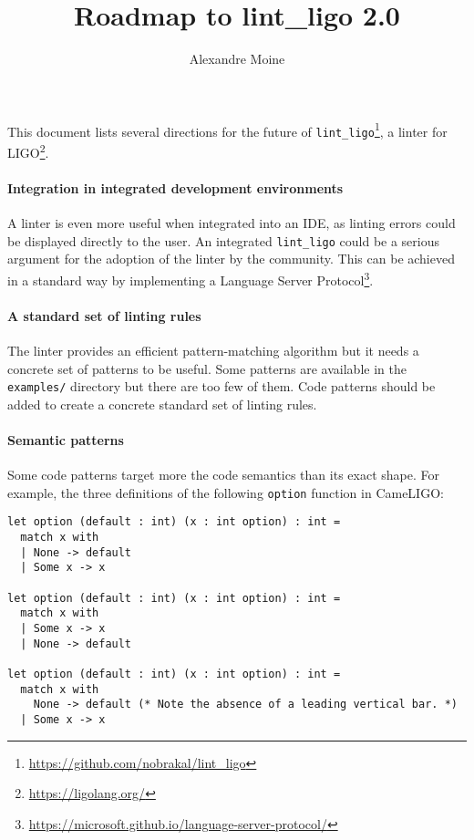 \documentclass[10pt,a4paper]{article}
\author{Alexandre Moine}
\title{Roadmap to lint\_ligo 2.0}
\begin{document}
\maketitle

This document lists several directions for the future of
\verb|lint_ligo|\footnote{\url{https://github.com/nobrakal/lint_ligo}},
a linter for LIGO\footnote{\url{https://ligolang.org/}}.

\paragraph{Integration in integrated development environments}

A linter is even more useful when integrated into an IDE, as linting
errors could be displayed directly to the user.
%
An integrated \verb|lint_ligo| could be a serious argument for the
adoption of the linter by the community.
This can be achieved in a standard way by implementing a Language
Server Protocol\footnote{\url{https://microsoft.github.io/language-server-protocol/}}.

\paragraph{A standard set of linting rules}

The linter provides an efficient pattern-matching algorithm but it
needs a concrete set of patterns to be useful. Some patterns are
available in the \verb|examples/| directory but there are too few of
them. Code patterns should be added to create a concrete standard set
of linting rules.

\paragraph{Semantic patterns}
Some code patterns target more the code semantics than its exact
shape. For example, the three definitions of the following
\verb|option| function in CameLIGO:

\begin{verbatim}
let option (default : int) (x : int option) : int =
  match x with
  | None -> default
  | Some x -> x

let option (default : int) (x : int option) : int =
  match x with
  | Some x -> x
  | None -> default

let option (default : int) (x : int option) : int =
  match x with
    None -> default (* Note the absence of a leading vertical bar. *)
  | Some x -> x
\end{verbatim}
\end{document}

